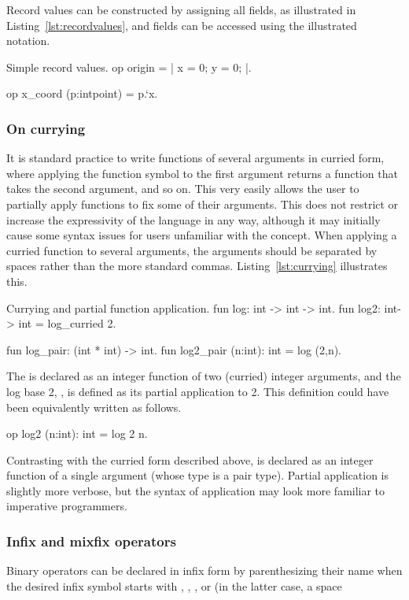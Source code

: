 Record values can be constructed by assigning all fields, as illustrated in
Listing~\ref{lst:recordvalues}, and fields can be accessed using the
illustrated notation.

\begin{easycrypt}[label={lst:recordvalues}]{Simple record values.}
op origin = {| x = 0; y = 0; |}.

op x_coord (p:intpoint) = p.`x.
\end{easycrypt}

\subsubsection*{On currying}
It is standard practice to write functions of several arguments in curried form,
where applying the function symbol to the first argument returns a function that
takes the second argument, and so on. This very easily allows the user to
partially apply functions to fix some of their arguments. This does not restrict
or increase the expressivity of the language in any way, although it may
initially cause some syntax issues for users unfamiliar with the concept. When
applying a curried function to several arguments, the arguments should be
separated by spaces rather than the more standard commas.
Listing~\ref{lst:currying} illustrates this.

\begin{easycrypt}[label={lst:currying}]{Currying and partial function application.}
fun log: int -> int -> int.
fun log2: int-> int = log_curried 2.

fun log_pair: (int * int) -> int.
fun log2_pair (n:int): int = log (2,n).
\end{easycrypt}

The  is declared as an integer function of two (curried) integer
arguments, and the log base 2, , is defined as its partial
application to 2. This definition could have been equivalently written as
follows.
\begin{easycrypt}[frame=none]{}
op log2 (n:int): int = log 2 n.
\end{easycrypt}
Contrasting with the curried form described above,  is declared
as an integer function of a single argument (whose type is a pair type).
Partial application is slightly more verbose, but the syntax of application may
look more familiar to imperative programmers.

\subsubsection*{Infix and mixfix operators}
Binary operators can be declared in infix form by parenthesizing their name when
the desired infix symbol starts with \ec{+}, \ec{:}, \ec{^}, or \ec{*} (in the
latter case, a space

